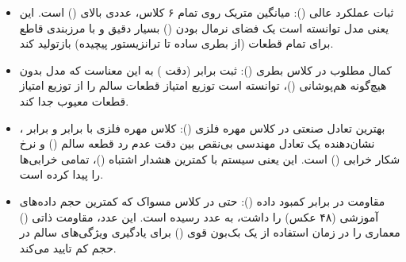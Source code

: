 \documentclass{article}
\begin{document}
\begin{itemize}
		\item ثبات عملکرد عالی (): میانگین متریک  روی تمام ۶ کلاس، عددی بالای  () است. این یعنی مدل  توانسته است یک فضای نرمال بودن () بسیار دقیق و با مرزبندی قاطع برای تمام قطعات (از بطری ساده تا ترانزیستور پیچیده) بازتولید کند.
		
		\item کمال مطلوب در کلاس بطری (): ثبت  برابر  (دقت ) به این معناست که مدل بدون هیچ‌گونه هم‌پوشانی ()، توانسته است توزیع امتیاز قطعات سالم را از توزیع امتیاز قطعات معیوب جدا کند.
		
		\item بهترین تعادل صنعتی در کلاس مهره فلزی (): کلاس مهره فلزی با  برابر  و  برابر ، نشان‌دهنده یک تعادل مهندسی بی‌نقص بین دقت عدم رد قطعه سالم () و نرخ شکار خرابی () است. این یعنی سیستم با کمترین هشدار اشتباه ()، تمامی خرابی‌ها را پیدا کرده است.
		
		\item مقاومت در برابر کمبود داده (): حتی در کلاس مسواک که کمترین حجم داده‌های آموزشی (۴۸ عکس) را داشت،  به عدد  رسیده است. این عدد، مقاومت ذاتی () معماری  را در زمان استفاده از یک بک‌بون قوی () برای یادگیری ویژگی‌های سالم در حجم کم تایید می‌کند.
	\end{itemize}
	
\end{document}
